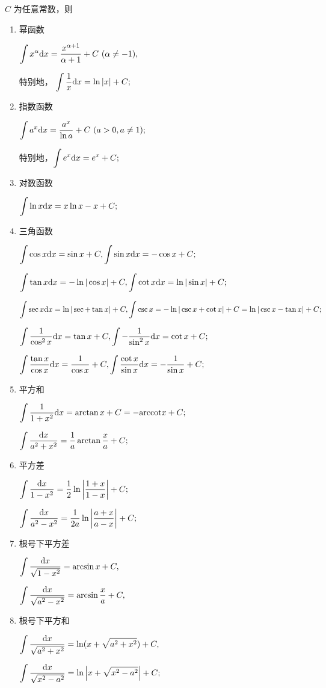 $ C $ 为任意常数，则
\begin{enumerate}
    \item 幂函数
    
    $\displaystyle \int x^\alpha \mathrm{d}x = \frac{x^{\alpha +1}}{\alpha + 1} + C\ (\alpha \neq -1), $
    
    特别地， $\displaystyle \int \frac{1}{x} \mathrm{d}x = \ln|x| + C; $ 
    \item 指数函数
    
    $\displaystyle \int a^x \mathrm{d}x = \frac{a^x}{\ln a} + C\ (a>0,a\neq 1) ; $
    
    特别地，$\displaystyle \int e^x\mathrm{d}x = e^x+C ; $
    \item 对数函数
    
    $ \displaystyle \int\ln x\mathrm{d}x = x \ln x - x + C; $ 
    \item 三角函数
    
    $ \displaystyle \int \cos x \mathrm{d}x = \sin x + C, \displaystyle \int \sin x \mathrm{d}x = -\cos x + C ; $

    $ \displaystyle \int \tan x\mathrm{d}x = -\ln|\cos x| + C,\int \cot x \mathrm{d}x = \ln|\sin x| + C; $ 

    $ \displaystyle \int \sec x\mathrm{d}x = \ln|\sec + \tan x| + C,\int \csc x= -\ln|\csc x + \cot x| + C
    = \ln|\csc x - \tan x| + C; $ 

    $\displaystyle \int \frac{1}{\cos^2 x}\mathrm{d}x = \tan x + C, \displaystyle \int -\frac{1}{\sin^2 x}\mathrm{d}x = \cot x + C ; $

    $\displaystyle \int \frac{\tan x}{\cos x} \mathrm{d}x = \frac{1}{\cos x} + C, 
    \displaystyle \int \frac{\cot x}{\sin x}\mathrm{d}x = -\frac{1}{\sin x} + C ; $
    \item 平方和
    
    $\displaystyle \int \frac{1}{1+x^2}\mathrm{d}x = \arctan x + C = -\textrm{arccot} x + C; $

    $ \displaystyle \int \dfrac{\mathrm{d}x}{a^2 + x^2} = \dfrac{1}{a}\arctan \dfrac{x}{a} + C; $    
    \item 平方差
    
    $ \displaystyle \int \dfrac{\mathrm{d}x}{1-x^2} = \dfrac{1}{2}\ln\left|\dfrac{1+x}{1-x}\right| + C; $ 

    $ \displaystyle \int \dfrac{\mathrm{d}x}{a^2-x^2} = \dfrac{1}{2a}\ln\left|\dfrac{a+x}{a-x}\right| + C; $ 
    
    \item 根号下平方差
    
    $ \displaystyle \int \dfrac{\mathrm{d}x}{\sqrt{1-x^2}} = \arcsin x + C,$

    $ \displaystyle \int \dfrac{\mathrm{d}x}{\sqrt{a^2-x^2}} = \arcsin \dfrac{x}{a} + C,$
    \item 根号下平方和
    
    $ \displaystyle \int \dfrac{\mathrm{d}x}{\sqrt{a^2+x^2}} = \ln(x + \sqrt{a^2+x^2}) + C,$

    $ \displaystyle \int \dfrac{\mathrm{d}x}{\sqrt{x^2 - a^2}} = \ln\left|x + \sqrt{x^2-a^2}\right| + C;$
\end{enumerate}    



